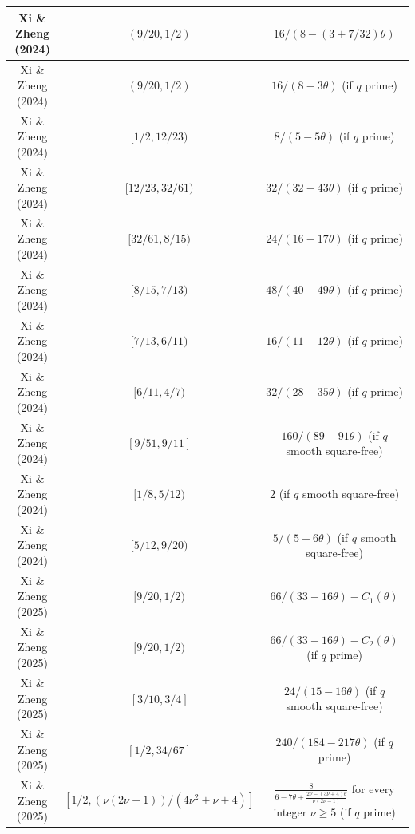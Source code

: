 \begin{table}[ht]
\begin{tabular}{|c|c|c|}
    \hline
    Xi \& Zheng (2024) \cite{xi-zheng} & $(9/20,1/2)$ & $16/(8-(3+7/32)\theta)$ \\
    \hline
    Xi \& Zheng (2024) \cite{xi-zheng} & $(9/20,1/2)$ & $16/(8-3\theta)$ (if $q$ prime)\\
    \hline
    Xi \& Zheng (2024) \cite{xi-zheng} & $[1/2,12/23)$ & $8/(5-5\theta)$ (if $q$ prime)\\
    \hline
    Xi \& Zheng (2024) \cite{xi-zheng} & $[12/23,32/61)$ & $32/(32-43\theta)$ (if $q$ prime)\\
    \hline
    Xi \& Zheng (2024) \cite{xi-zheng} & $[32/61,8/15)$ & $24/(16-17\theta)$ (if $q$ prime)\\
    \hline
    Xi \& Zheng (2024) \cite{xi-zheng} & $[8/15,7/13)$ & $48/(40-49\theta)$ (if $q$ prime)\\
    \hline
    Xi \& Zheng (2024) \cite{xi-zheng} & $[7/13,6/11)$ & $16/(11-12\theta)$ (if $q$ prime)\\
    \hline
    Xi \& Zheng (2024) \cite{xi-zheng} & $[6/11,4/7)$ & $32/(28-35\theta)$ (if $q$ prime)\\
    \hline
    Xi \& Zheng (2024) \cite{xi-zheng} & $[9/51,9/11]$ & $160/(89-91\theta)$ (if $q$ smooth square-free)\\
    \hline
    Xi \& Zheng (2024) \cite{xi-zheng} & $[1/8,5/12)$ & $2$ (if $q$ smooth square-free)\\
    \hline
    Xi \& Zheng (2024) \cite{xi-zheng} & $[5/12,9/20)$ & $5/(5-6\theta)$ (if $q$ smooth square-free)\\
    \hline
    Xi \& Zheng (2025) \cite{xi-zheng-1} & $[9/20,1/2)$ & $66/(33-16\theta) - C_1(\theta)$ \\
    \hline
    Xi \& Zheng (2025) \cite{xi-zheng-1} & $[9/20,1/2)$ & $66/(33-16\theta) - C_2(\theta)$ (if $q$ prime)\\
    \hline
    Xi \& Zheng (2025) \cite{xi-zheng-1} & $[3/10,3/4]$ & $24/(15-16\theta)$ (if $q$ smooth square-free)\\
    \hline
    Xi \& Zheng (2025) \cite{xi-zheng-2} & $[1/2,34/67]$ & $240/(184-217\theta)$ (if $q$ prime)\\
    \hline
    Xi \& Zheng (2025) \cite{xi-zheng-2} & $[1/2,(\nu (2 \nu +1))/(4 \nu^2 + \nu + 4)]$ & $\frac{8}{6 - 7 \theta + \frac{2 \nu - (3 \nu + 4) \theta}{\nu (2 \nu - 1)}}$ for every integer $\nu \geq 5$ (if $q$ prime)\\
    \hline
    \end{tabular}
\end{table}

